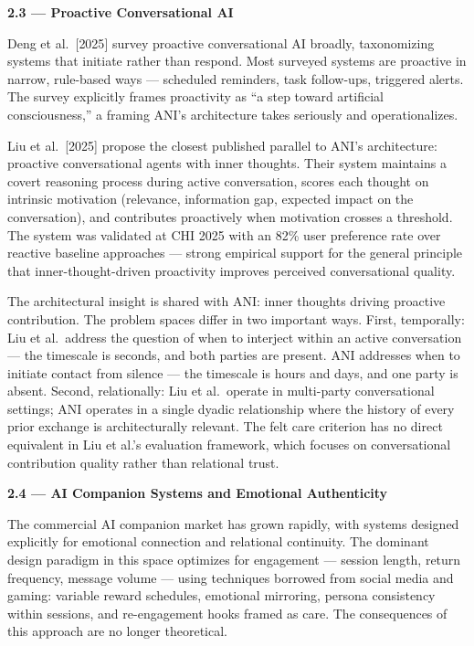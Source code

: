 \documentclass[12pt]{article}
\begin{document}
\textbf{2.3 --- Proactive Conversational AI}

Deng et al.~{[}2025{]} survey proactive conversational AI broadly,
taxonomizing systems that initiate rather than respond. Most surveyed
systems are proactive in narrow, rule-based ways --- scheduled
reminders, task follow-ups, triggered alerts. The survey explicitly
frames proactivity as ``a step toward artificial consciousness,'' a
framing ANI's architecture takes seriously and operationalizes.

Liu et al.~{[}2025{]} propose the closest published parallel to ANI's
architecture: proactive conversational agents with inner thoughts. Their
system maintains a covert reasoning process during active conversation,
scores each thought on intrinsic motivation (relevance, information gap,
expected impact on the conversation), and contributes proactively when
motivation crosses a threshold. The system was validated at CHI 2025
with an 82\% user preference rate over reactive baseline approaches ---
strong empirical support for the general principle that
inner-thought-driven proactivity improves perceived conversational
quality.

The architectural insight is shared with ANI: inner thoughts driving
proactive contribution. The problem spaces differ in two important ways.
First, temporally: Liu et al.~address the question of when to interject
within an active conversation --- the timescale is seconds, and both
parties are present. ANI addresses when to initiate contact from silence
--- the timescale is hours and days, and one party is absent. Second,
relationally: Liu et al.~operate in multi-party conversational settings;
ANI operates in a single dyadic relationship where the history of every
prior exchange is architecturally relevant. The felt care criterion has
no direct equivalent in Liu et al.'s evaluation framework, which focuses
on conversational contribution quality rather than relational trust.

\textbf{2.4 --- AI Companion Systems and Emotional Authenticity}

The commercial AI companion market has grown rapidly, with systems
designed explicitly for emotional connection and relational continuity.
The dominant design paradigm in this space optimizes for engagement ---
session length, return frequency, message volume --- using techniques
borrowed from social media and gaming: variable reward schedules,
emotional mirroring, persona consistency within sessions, and
re-engagement hooks framed as care. The consequences of this approach
are no longer theoretical.
\end{document}
